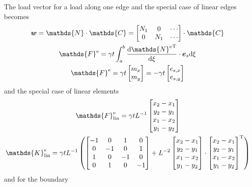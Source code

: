 \documentclass[a4paper,11pt]{article}
\renewcommand{\to}[1]{\text{\boldmath $#1$}} %
\newcommand{\uv}[1]{\mathds{#1}}
\newcommand{\um}[1]{\mathds{#1}}
\newcommand{\intd}[1]{{\rm d}#1}
\newcommand{\dderiv}[2]{\frac{{\rm d}#1}{{\rm d}#2}}
\newcommand{\T}{{\rm T}}
\newcommand{\element}{{\rm e}}
\newcommand{\linear}{{\rm lin}}
\begin{document}
The load vector for a load along one edge and the special case of linear edges becomes
\begin{gather}
 \to w = \um{N}\cdot\um{C} = \begin{bmatrix}N_1 & 0 & \cdots\\ 0 & N_1 & \cdots \end{bmatrix}\cdot \um{C}\\
 \um F^\element = \gamma t \int_a^b \dderiv{{\um N^\element}^\T}{\xi}\cdot \to e_s \intd\xi\\
 \um F^\element = \gamma t \begin{bmatrix}m_x\\m_y\end{bmatrix} = - \gamma t \begin{bmatrix}e_{s,x}\\e_{s,y}\end{bmatrix}
\end{gather}
and the special case of linear elements
\begin{gather}
 \uv F^\element_\linear = \gamma t L^{-1} \begin{bmatrix}x_2-x_1\\y_2-y_1\\x_1-x_2\\y_1-y_2\end{bmatrix}\\
 \um K^\element_\linear = \gamma t L^{-1}\left(
	\begin{bmatrix}-1&0&1&0\\0&-1&0&1\\1&0&-1&0\\0&1&0&-1\end{bmatrix}+
	L^{-2}\begin{bmatrix}x_2-x_1\\y_2-y_1\\x_1-x_2\\y_1-y_2\end{bmatrix}\cdot\begin{bmatrix}x_2-x_1\\y_2-y_1\\x_1-x_2\\y_1-y_2\end{bmatrix}^\T
  \right)
\end{gather}
and for the boundary
\end{document}
